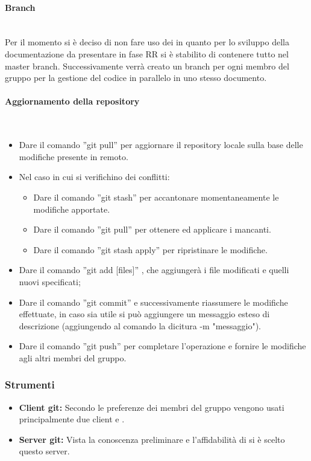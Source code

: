 \paragraph{Branch}
~\\
Per il momento si è deciso di non fare uso dei  in quanto per lo sviluppo della documentazione da presentare in fase RR si è stabilito di contenere tutto nel master branch. Successivamente verrà creato un branch per ogni membro del gruppo per la gestione del codice in parallelo in uno stesso documento.
\paragraph{Aggiornamento della repository}
~\\
\begin{itemize}
    \item Dare il comando ”git pull” per aggiornare il repository locale sulla base delle modifiche presente in remoto.
    \item Nel caso in cui si verifichino dei conflitti:
    \begin{itemize}
        \item Dare il comando ”git stash” per accantonare momentaneamente le modifiche apportate.
        \item Dare il comando ”git pull” per ottenere ed applicare i  mancanti.
        \item Dare il comando ”git stash apply” per ripristinare le modifiche.
    \end{itemize}
    \item Dare il comando ”git add [files]” ,  che aggiungerà i file modificati e quelli nuovi specificati;
    \item Dare  il  comando  ”git  commit”  e  successivamente  riassumere  le  modifiche effettuate, in caso sia utile si può aggiungere un messaggio esteso di descrizione (aggiungendo al comando la dicitura -m "messaggio").
    \item Dare il comando ”git push” per completare l’operazione e fornire le modifiche agli altri membri del gruppo.
    
\end{itemize}

\subsubsection{Strumenti}

    \begin{itemize}
        \item\textbf{Client git:} 
        Secondo le preferenze dei membri del gruppo vengono usati principalmente due client  e .
        \item\textbf{Server git:}
        Vista la conoscenza preliminare e l'affidabilità di  si è scelto questo server.
        
    \end{itemize}

    
